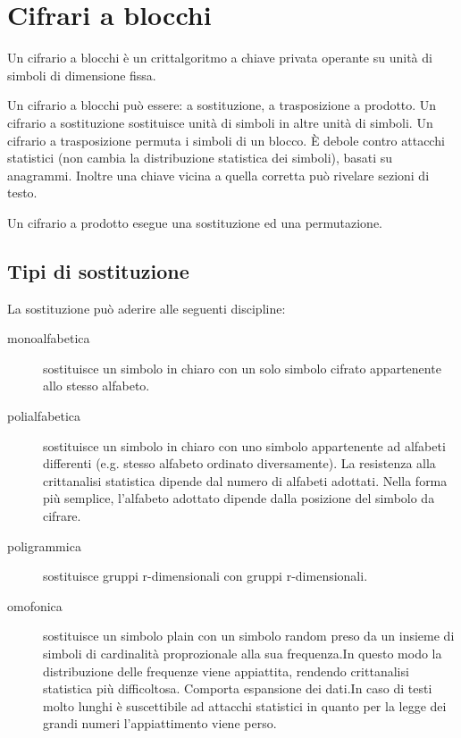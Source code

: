 \chapter{Cifrari a blocchi}
\label{chp:block-ciphers}

Un cifrario a blocchi è un crittalgoritmo a chiave privata operante su unità di simboli di dimensione fissa.

Un cifrario a blocchi può essere: a sostituzione, a trasposizione a prodotto.
Un cifrario a sostituzione sostituisce unità di simboli in altre unità di simboli.
Un cifrario a trasposizione permuta i simboli di un blocco. È debole contro attacchi statistici (non cambia la distribuzione statistica dei simboli), basati su anagrammi. Inoltre una chiave vicina a quella corretta può rivelare sezioni di testo.

Un cifrario a prodotto esegue una sostituzione ed una permutazione.

\section{Tipi di sostituzione}
La sostituzione può aderire alle seguenti discipline:

\begin{description}
  \item[monoalfabetica] sostituisce un simbolo in chiaro con un solo simbolo cifrato appartenente allo stesso alfabeto.

  \item[polialfabetica] sostituisce un simbolo in chiaro con uno simbolo appartenente ad alfabeti differenti (e.g. stesso alfabeto ordinato diversamente).
  La resistenza alla crittanalisi statistica dipende dal numero di alfabeti adottati. Nella forma più semplice, l'alfabeto adottato dipende dalla posizione del simbolo da cifrare.

  \item[poligrammica] sostituisce gruppi r-dimensionali con gruppi r-dimensionali.

  \item[omofonica] sostituisce un simbolo plain con un simbolo random preso da un insieme di simboli di cardinalità proprozionale alla sua frequenza.In questo modo la distribuzione delle frequenze viene appiattita, rendendo crittanalisi statistica più difficoltosa. Comporta espansione dei dati.In caso di testi molto lunghi è suscettibile ad attacchi statistici in quanto per la legge dei grandi numeri l'appiattimento viene perso.
\end{description}

